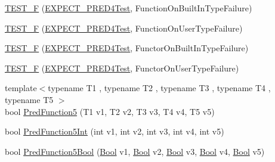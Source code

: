 \begin{DoxyCompactItemize}
\item 
\mbox{\hyperlink{googletest-master_2googletest_2test_2gtest__pred__impl__unittest_8cc_a036a7d32fdb4da1b6db4966f4b8fa711}{T\+E\+S\+T\+\_\+F}} (\mbox{\hyperlink{googletest-master_2googletest_2test_2gtest__pred__impl__unittest_8cc_abbf7ac63ea663c0dec815df5770cd2a8}{E\+X\+P\+E\+C\+T\+\_\+\+P\+R\+E\+D4\+Test}}, Function\+On\+Built\+In\+Type\+Failure)
\item 
\mbox{\hyperlink{googletest-master_2googletest_2test_2gtest__pred__impl__unittest_8cc_a952a5460f9f761948d852ce164241e0f}{T\+E\+S\+T\+\_\+F}} (\mbox{\hyperlink{googletest-master_2googletest_2test_2gtest__pred__impl__unittest_8cc_abbf7ac63ea663c0dec815df5770cd2a8}{E\+X\+P\+E\+C\+T\+\_\+\+P\+R\+E\+D4\+Test}}, Function\+On\+User\+Type\+Failure)
\item 
\mbox{\hyperlink{googletest-master_2googletest_2test_2gtest__pred__impl__unittest_8cc_a971a33d3e9ef7ab80cca352c1ffb9259}{T\+E\+S\+T\+\_\+F}} (\mbox{\hyperlink{googletest-master_2googletest_2test_2gtest__pred__impl__unittest_8cc_abbf7ac63ea663c0dec815df5770cd2a8}{E\+X\+P\+E\+C\+T\+\_\+\+P\+R\+E\+D4\+Test}}, Functor\+On\+Built\+In\+Type\+Failure)
\item 
\mbox{\hyperlink{googletest-master_2googletest_2test_2gtest__pred__impl__unittest_8cc_a1a34c19097ac1b8c806460f6bbaad59a}{T\+E\+S\+T\+\_\+F}} (\mbox{\hyperlink{googletest-master_2googletest_2test_2gtest__pred__impl__unittest_8cc_abbf7ac63ea663c0dec815df5770cd2a8}{E\+X\+P\+E\+C\+T\+\_\+\+P\+R\+E\+D4\+Test}}, Functor\+On\+User\+Type\+Failure)
\item 
{\footnotesize template$<$typename T1 , typename T2 , typename T3 , typename T4 , typename T5 $>$ }\\bool \mbox{\hyperlink{googletest-master_2googletest_2test_2gtest__pred__impl__unittest_8cc_aacb9302c548682f154ddf1a02a23a99f}{Pred\+Function5}} (T1 v1, T2 v2, T3 v3, T4 v4, T5 v5)
\item 
bool \mbox{\hyperlink{googletest-master_2googletest_2test_2gtest__pred__impl__unittest_8cc_ac2bb9ad4db9fc578bd739bbba5aa374f}{Pred\+Function5\+Int}} (int v1, int v2, int v3, int v4, int v5)
\item 
bool \mbox{\hyperlink{googletest-master_2googletest_2test_2gtest__pred__impl__unittest_8cc_a6e081dd19571256aef33154ce936563f}{Pred\+Function5\+Bool}} (\mbox{\hyperlink{struct_bool}{Bool}} v1, \mbox{\hyperlink{struct_bool}{Bool}} v2, \mbox{\hyperlink{struct_bool}{Bool}} v3, \mbox{\hyperlink{struct_bool}{Bool}} v4, \mbox{\hyperlink{struct_bool}{Bool}} v5)
\item 

\end{DoxyCompactItemize}
